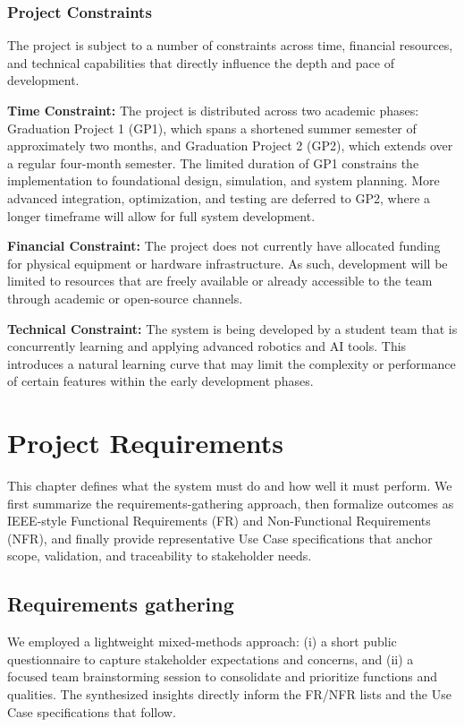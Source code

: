 \documentclass[12pt,a4paper]{report}
\begin{document}
\subsection{Project Constraints}
The project is subject to a number of constraints across time, financial resources, and technical capabilities that directly influence the depth and pace of development.

\textbf{Time Constraint:}  
The project is distributed across two academic phases: Graduation Project 1 (GP1), which spans a shortened summer semester of approximately two months, and Graduation Project 2 (GP2), which extends over a regular four-month semester. The limited duration of GP1 constrains the implementation to foundational design, simulation, and system planning. More advanced integration, optimization, and testing are deferred to GP2, where a longer timeframe will allow for full system development.

\textbf{Financial Constraint:}  
The project does not currently have allocated funding for physical equipment or hardware infrastructure. As such, development will be limited to resources that are freely available or already accessible to the team through academic or open-source channels.

\textbf{Technical Constraint:}  
The system is being developed by a student team that is concurrently learning and applying advanced robotics and \ac{AI} tools. This introduces a natural learning curve that may limit the complexity or performance of certain features within the early development phases.


\chapter{Project Requirements}
\noindent
This chapter defines what the system must do and how well it must perform. We first summarize the requirements-gathering approach, then formalize outcomes as IEEE-style Functional Requirements (FR) and Non-Functional Requirements (NFR), and finally provide representative Use Case specifications that anchor scope, validation, and traceability to stakeholder needs.

\section{Requirements gathering}
\noindent
We employed a lightweight mixed-methods approach: (i) a short public questionnaire to capture stakeholder expectations and concerns, and (ii) a focused team brainstorming session to consolidate and prioritize functions and qualities. The synthesized insights directly inform the FR/NFR lists and the Use Case specifications that follow.
\end{document}
